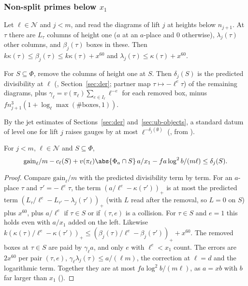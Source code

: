 \subsubsection{Non-split primes below $x_1$}
Let $\ell\in\mathcal N$ and $j<m$, and read the diagrams of lift $j$ at heights below
$n_{j+1}$. At $\tau$ there are $L_\tau$ columns of height one ($a$ at an $a$-place and $0$
otherwise), $\lambda_j(\tau)$ other columns, and $\beta_j(\tau)$ boxes in these. Then
$k\kappa(\tau)\le\beta_j(\tau)\le k\kappa(\tau)+x^{60}$ and $\lambda_j(\tau)\le\kappa(\tau)+x^{60}$.

\begin{definition}
For $S\subseteq\Phi$, remove the columns of height one at $S$. Then $\delta_j(S)$ is the predicted
divisibility at $\ell$ (, Section~\ref{sec:der}; partner map
$\tau\mapsto-\ell^e\tau$) of the remaining diagrams, plus $\gamma_\ell=v(\pi_\ell)\sum_{e\in I_\ell}\ell^{-e}$
for each removed box, minus $fn_{j+1}^3(1+\log_\ell\max(\#\mathrm{boxes},1))$.
\end{definition}

By the jet estimates of Sections~\ref{sec:der} and~\ref{sec:ub-objects}, a standard datum of level one for lift $j$ raises
gauges by at most $\ell^{-\delta_j(\emptyset)}$ (,
from ).

\begin{lemma}\label{ub-divis:lem:only}
For $j<m$, $\ell\in\mathcal N$ and $S\subseteq\Phi$,
\[\mathrm{gain}_\ell/m-c_\ell(S)+v(\pi_\ell)\abs{\Phi_a\cap S}\,a/x_1-fa\log^2b/(m\ell)\le\delta_j(S).\]
\end{lemma}

\begin{proof}
Compare $\mathrm{gain}_\ell/m$ with the predicted divisibility term by term. For an $a$-place $\tau$
and $\tau'=-\ell^e\tau$, the term $(a/\ell^e-\kappa(\tau'))_+$ is at most the predicted term
$(L_\tau/\ell^e-L_{\tau'}-\lambda_j(\tau'))_+$ (with $L$ read after the removal, so $L=0$ on $S$) plus
$x^{60}$, plus $a/\ell^e$ if $\tau\in S$ or if
$(\tau,e)$ is a collision. For $\tau\in S$ and $e=1$ this holds even with $a/x_1$ added on the left.
Likewise $k(\kappa(\tau)/\ell^e-\kappa(\tau'))_+\le(\beta_j(\tau)/\ell^e-\beta_j(\tau'))_++x^{60}$. The
removed boxes at $\tau\in S$ are paid by $\gamma_\ell a$, and only $e$ with $\ell^e<x_1$ count. The errors
are $2x^{60}$ per pair $(\tau,e)$, $\gamma_\ell\lambda_j(\tau)\le a/(\ell m)$, the correction at $\ell=d$ and
the logarithmic term. Together they are at most $fa\log^2b/(m\ell)$, as $a=xb$ with $b$ far larger
than $x_1$ ().
\end{proof}

